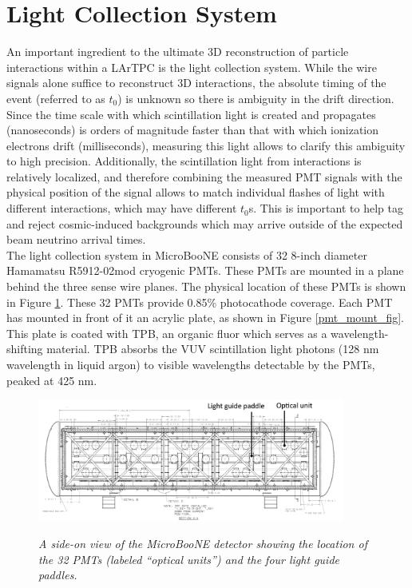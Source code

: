 \section{Light Collection System}
An important ingredient to the ultimate 3D reconstruction of particle interactions within a LArTPC is the light collection system. While the wire signals alone suffice to reconstruct 3D interactions, the absolute timing of the event (referred to as $t_0$) is unknown so there is ambiguity in the drift direction. Since the time scale with which scintillation light is created and propagates (nanoseconds) is orders of magnitude faster than that with which ionization electrons drift (milliseconds), measuring this light allows to clarify this ambiguity to high precision. Additionally, the scintillation light from interactions is relatively localized, and therefore combining the measured PMT signals with the physical position of the signal allows to match individual flashes of light with different interactions, which may have different $t_0$s. This is important to help tag and reject cosmic-induced backgrounds which may arrive outside of the expected beam neutrino arrival times.\\

The light collection system in MicroBooNE consists of 32 8-inch diameter Hamamatsu R5912-02mod cryogenic PMTs. These PMTs are mounted in a plane behind the three sense wire planes. The physical location of these PMTs is shown in Figure \ref{pmt_placement_fig}. These 32 PMTs provide 0.85\% photocathode coverage. Each PMT has mounted in front of it an acrylic plate, as shown in Figure \ref{pmt_mount_fig}. This plate is coated with TPB, an organic fluor which serves as a wavelength-shifting material. TPB absorbs the VUV scintillation light photons (128 nm wavelength in liquid argon) to visible wavelengths detectable by the PMTs, peaked at 425 nm.

\begin{figure}[ht!]
\centering
	\includegraphics[width=0.9\textwidth]{Figures/pmt_placement.png} \\
\caption{\textit{A side-on view of the MicroBooNE detector showing the location of the 32 PMTs (labeled ``optical units'') and the four light guide paddles.}}\label{pmt_placement_fig}
\end{figure}


